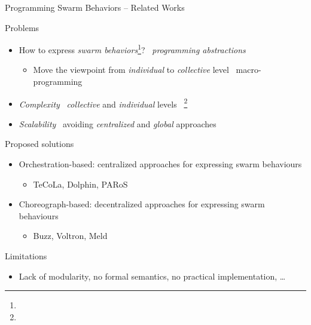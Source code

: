\documentclass[presentation, 9pt]{beamer}\mode<presentation>{\usetheme{AMSBolognaFC}}
\begin{document}
\begin{frame}{Programming Swarm Behaviors -- Related Works}
	\begin{block}{Problems}
		\begin{itemize}
			\item How to express \emph{swarm behaviors}\footnote{}? \faArrowRight \, \emph{programming abstractions} 
			\begin{itemize}
				\item Move the viewpoint from \emph{individual} to \emph{collective} level \faArrowRight \, macro-programming 
			\end{itemize}
			\item \emph{Complexity} \faArrowRight \, \emph{collective} and \emph{individual} levels \faArrowRight \, \footnote{}
			\item \emph{Scalability} \faArrowRight \, avoiding \emph{centralized} and \emph{global} approaches
		\end{itemize}
	\end{block}
	\begin{alertblock}{Proposed solutions}
		\begin{itemize}
			\item Orchestration-based: centralized approaches for expressing swarm behaviours
			\begin{itemize}
				\item TeCoLa, Dolphin, PARoS
			\end{itemize}
			\item Choreograph-based: decentralized approaches for expressing swarm behaviours
			\begin{itemize}
				\item Buzz, Voltron, Meld
			\end{itemize}
		\end{itemize}
	\end{alertblock}
	\begin{block}{Limitations}
		\begin{itemize}
			\item Lack of modularity, no formal semantics, no practical implementation, \dots
		\end{itemize}
	\end{block}
\end{frame}
\end{document}
